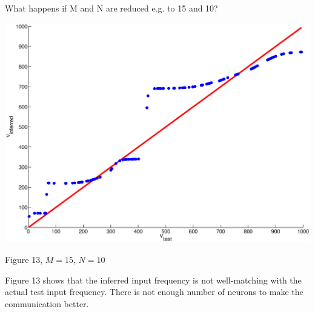 \documentclass{article}
\begin{document}
What happens if M and N are reduced e.g. to 15 and 10? 
\begin{center}
\includegraphics[width=\textwidth]{MN_small1.eps}
\begin{footnotesize}
 Figure 13, $M=15$, $N=10$
\end{footnotesize}
\end{center}

Figure 13 shows that the inferred input frequency is not well-matching with the actual test input frequency. There is not enough number of neurons to make the communication better.
\end{document}

